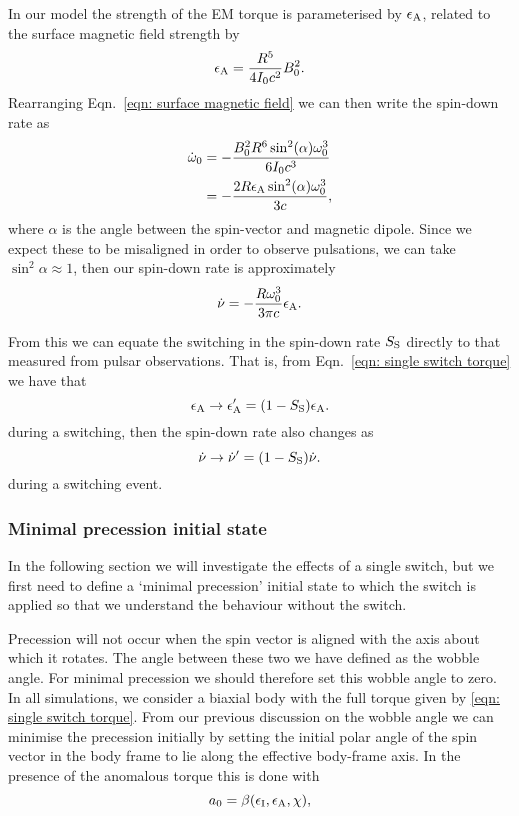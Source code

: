 \documentclass[../full_thesis/full_thesis.tex]{subfiles}
\begin{document}
In our model the strength of the EM torque is parameterised
by $\epsilon_{\mathrm{A}}$, related to the surface magnetic field strength by
\begin{align}
    \epsilon_{\mathrm{A}} = \frac{R^{5}}{4I_{0} c^{2}} B_{0}^{2}.
\end{align}
Rearranging Eqn.~\eqref{eqn: surface magnetic field} we can then write the
spin-down rate as
\begin{align}
    \dot{\omega}_{0} & = -\frac{B_{0}^{2}R^{6} \sin^{2}(\alpha) \omega_{0}^{3}}{6 I_{0} c^{3}} \\
    & = - \frac{2 R \epsilon_{\mathrm{A}} \sin^{2}(\alpha) \omega_{0}^{3}}{3 c},
\end{align}
where $\alpha$ is the angle between the spin-vector and magnetic dipole. Since
we expect these to be misaligned in order to observe pulsations, we can take
$\sin^{2}\alpha \approx 1$, then our spin-down rate is approximately
\begin{equation}
    \dot{\nu} = - \frac{R\omega_{0}^{3}}{3\pi c}\epsilon_{\mathrm{A}}.
    \label{eqn: spin-down of epsA}
\end{equation}

From this we can equate the switching in the spin-down rate $S_{\mathrm{S}}$ directly to
that measured from pulsar observations. That is, from Eqn.~\eqref{eqn: single switch torque}
we have that
\begin{equation}
    \epsilon_{\mathrm{A}} \rightarrow \epsilon_{\mathrm{A}}' = (1-S_{\mathrm{S}})\epsilon_{\mathrm{A}}.
\label{eqn: epsA switch}
\end{equation}
during a switching, then the spin-down rate also changes as
\begin{equation}
    \dot{\nu} \rightarrow \dot{\nu}' = (1-S_{\mathrm{S}})\dot{\nu}.
\label{eqn: nudot switch}
\end{equation}
during a switching event.


\subsubsection{Minimal precession initial state}
In the following section we will investigate the effects of a single switch, but
we first need to define a `minimal precession' initial state to which the
switch is applied so that we understand the behaviour without the switch.

Precession will not occur when the spin vector is aligned with the axis about
which it rotates. The angle between these two we have defined as the wobble
angle.  For minimal precession we should therefore set this wobble angle to
zero. In all simulations, we consider a biaxial body with the full torque given
by \eqref{eqn: single switch torque}. From our previous discussion on the
wobble angle we can minimise the precession initially by setting the initial polar angle
of the spin vector in the body frame to lie along the effective body-frame
axis. In the presence of the anomalous torque this is done with
\begin{equation}
a_{0} = \beta(\epsilon_{\mathrm{I}}, \epsilon_{\mathrm{A}}, \chi),
\end{equation}
\end{document}
